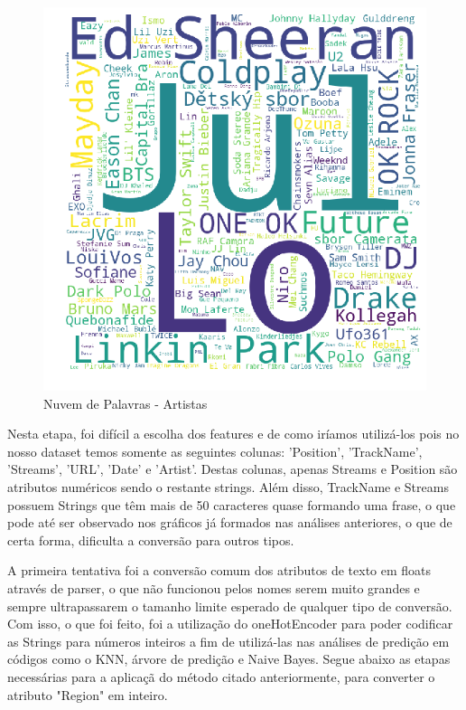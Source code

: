 \documentclass[11pt]{article}
\makeatletter
\def\maxwidth{\ifdim\Gin@nat@width>\linewidth\linewidth
    \else\Gin@nat@width\fi}
\let\Oldincludegraphics\includegraphics
\renewcommand{\includegraphics}[1]{\Oldincludegraphics[width=.8\maxwidth]{#1}}
\makeatother
\begin{document}
\begin{figure}
\centering
\includegraphics{wordcloud.png}
\caption{Nuvem de Palavras - Artistas}
\end{figure}

    Nesta etapa, foi difícil a escolha dos features e de como iríamos
utilizá-los pois no nosso dataset temos somente as seguintes colunas:
'Position', 'TrackName', 'Streams', 'URL', 'Date' e 'Artist'. Destas
colunas, apenas Streams e Position são atributos numéricos sendo o
restante strings. Além disso, TrackName e Streams possuem Strings que
têm mais de 50 caracteres quase formando uma frase, o que pode até ser
observado nos gráficos já formados nas análises anteriores, o que de
certa forma, dificulta a conversão para outros tipos.

    A primeira tentativa foi a conversão comum dos atributos de texto em
floats através de parser, o que não funcionou pelos nomes serem muito
grandes e sempre ultrapassarem o tamanho limite esperado de qualquer
tipo de conversão. Com isso, o que foi feito, foi a utilização do
oneHotEncoder para poder codificar as Strings para números inteiros a
fim de utilizá-las nas análises de predição em códigos como o KNN,
árvore de predição e Naive Bayes. Segue abaixo as etapas necessárias
para a aplicaçã do método citado anteriormente, para converter o
atributo "Region" em inteiro.
\end{document}
